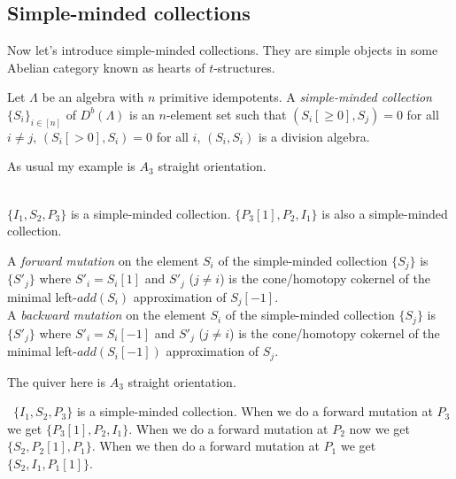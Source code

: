 \subsection{Simple-minded collections}
\indent Now let's introduce simple-minded collections. They are simple objects in some Abelian category known as hearts of $t$-structures.\\
\begin{definition}
Let $\Lambda$ be an algebra with $n$ primitive idempotents. A \textit{simple-minded collection} $\{S_i\}_{i\in [n]}$ of $D^b(\Lambda)$ is an $n$-element set such that $(S_i[\geq 0],S_j)=0$ for all $i\neq j$, $(S_i[>0], S_i) = 0$ for all $i$, $(S_i,S_i)$ is a division algebra.\\
\end{definition}
\begin{example}
\indent As usual my example is $A_3$ straight orientation.\\
\\
\indent $\{I_1, S_2, P_3\}$ is a simple-minded collection. $\{P_3[1], P_2, I_1\}$ is also a simple-minded collection.
\end{example}
\begin{definition}
A \textit{forward mutation} on the element $S_i$ of the simple-minded collection $\{S_j\}$ is $\{S'_j\}$ where $S'_i = S_i[1]$ and $S'_j$ ($j\neq i$) is the cone/homotopy cokernel of the minimal left-$add(S_i)$ approximation of $S_j[-1]$.\\
A \textit{backward mutation} on the element $S_i$ of the simple-minded collection $\{S_j\}$ is $\{S'_j\}$ where $S'_i = S_i[-1]$ and $S'_j$ ($j\neq i$) is the cone/homotopy cokernel of the minimal left-$add(S_i[-1])$ approximation of $S_j$.\\
\end{definition}
\begin{example}
\indent The quiver here is $A_3$ straight orientation.\\
\
\indent $\{I_1, S_2, P_3\}$ is a simple-minded collection. When we do a forward mutation at $P_3$ we get $\{P_3[1], P_2, I_1\}$. When we do a forward mutation at $P_2$ now we get $\{S_2, P_2[1], P_1\}$. When we then do a forward mutation at $P_1$ we get $\{S_2, I_1, P_1[1]\}$.
\end{example}
